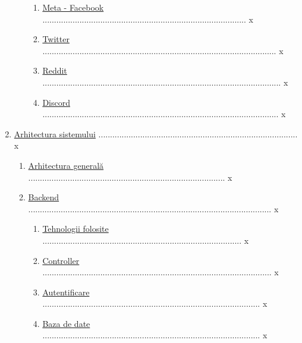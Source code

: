 \documentclass{article}
\begin{document}
\begin{enumerate}[itemsep=0.1ex,parsep=0.1ex,leftmargin=0cm]
\begin{enumerate}[label*=\arabic*.,ref=\theenumi.\arabic*,itemsep=0.1ex,parsep=0.1ex,leftmargin=0.25cm]
        \begin{enumerate}[label*=\arabic*.,ref=\theenumi.\theenumi.\arabic*,itemsep=0.1ex,parsep=0.1ex,leftmargin=0.3cm]
            \item \hyperref[Soluții similare Meta - Facebook]{Meta - Facebook} ........................................................................................ x
            \item \hyperref[Soluții similare Twitter]{Twitter} ..................................................................................................... x
            \item \hyperref[Soluții similare Reddit]{Reddit} ....................................................................................................... x
            \item \hyperref[Soluții similare Discord]{Discord} ...................................................................................................... x
        \end{enumerate}
    \end{enumerate}
    \item \hyperref[Arhitectura sistemului]{Arhitectura sistemului} ...................................................................................... x
    \begin{enumerate}[label*=\arabic*.,ref=\theenumi.\arabic*,itemsep=0.1ex,parsep=0.1ex,leftmargin=0.3cm]
        \item \hyperref[Arhitectura generală]{Arhitectura generală} ..................................................................................... x
        \item \hyperref[Backend]{Backend} ......................................................................................................... x
        \begin{enumerate}[label*=\arabic*.,ref=\theenumi.\theenumi.\arabic*,itemsep=0.1ex,parsep=0.1ex,leftmargin=0.3cm]
        \item \hyperref[Backend-tehnologii]{Tehnologii folosite} ...................................................................................... x
        \item \hyperref[Controller]{Controller} ................................................................................................... x
        \item \hyperref[Autentificare]{Autentificare} .............................................................................................. x
        \item \hyperref[Baza de date]{Baza de date} .............................................................................................. x

\end{enumerate}
\end{enumerate}
\end{enumerate}
\end{document}
